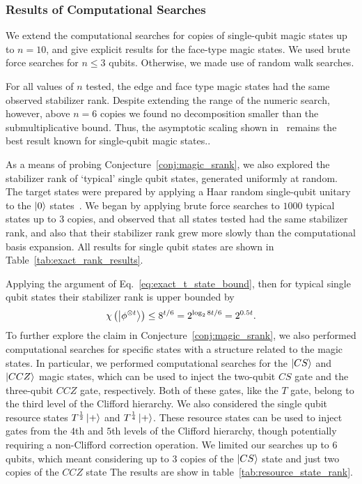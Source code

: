 \subsubsection*{Results of Computational Searches}
We extend the computational searches for copies of single-qubit magic states up to $n=10$, and give explicit results for the face-type magic states. We used brute force searches for $n\leq 3$ qubits. Otherwise, we made use of random walk searches. 
\par
For all values of $n$ tested, the edge and face type magic states had the same observed stabilizer rank. Despite extending the range of the numeric search, however, above $n=6$ copies we found no decomposition smaller than the submultiplicative bound. Thus, the asymptotic scaling shown in~\cite{Bravyi2015} remains the best result known for single-qubit magic states..\par
As a means of probing Conjecture~\ref{conj:magic_srank}, we also explored the stabilizer rank of `typical' single qubit states, generated uniformly at random. The target states were prepared by applying a Haar random single-qubit unitary to the $\ket{0}$ states~\cite{Lundberg2004}. We began by applying brute force searches to $1000$ typical states up to $3$ copies, and observed that all states tested had the same stabilizer rank, and also that their stabilizer rank grew more slowly than the computational basis expansion. All results for single qubit states are shown in Table~\ref{tab:exact_rank_results}.\par
Applying the argument of Eq.~\ref{eq:exact_t_state_bound}, then for typical single qubit states their stabilizer rank is upper bounded by
\begin{equation}
\chi\left(\ket{\phi^{\otimes t}}\right)\leq 8^{t/6}=2^{\log_{2}{8}t/6}=2^{0.5t}.
\label{eq:typical_state_srank}
\end{equation}
To further explore the claim in Conjecture~\ref{conj:magic_srank}, we also performed computational searches for specific states with a structure related to the magic states. In particular, we performed computational searches for the $\ket{CS}$ and $\ket{CCZ}$ magic states, which can be used to inject the two-qubit $CS$ gate and the three-qubit $CCZ$ gate, respectively. Both of these gates, like the $T$ gate, belong to the third level of the Clifford hierarchy. We also considered the single qubit resource states $T^{\frac{1}{2}}\ket{+}$ and $T^{\frac{1}{4}}\ket{+}$. These resource states can be used to inject gates from the $4$th and $5$th levels of the Clifford hierarchy, though potentially requiring a non-Clifford correction operation. We limited our searches up to $6$ qubits, which meant considering up to $3$ copies of the $\ket{CS}$ state and just two copies of the $CCZ$ state The results are show in table~\ref{tab:resource_state_rank}.\par
